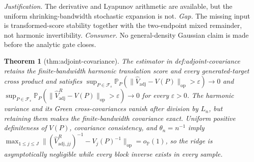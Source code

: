 \documentclass{article}
\newtheorem{theorem}{Theorem}
\begin{document}
\par\smallskip\noindent \textit{Justification.} The derivative and Lyapunov arithmetic are available, but the uniform shrinking-bandwidth stochastic expansion is not. \textit{Gap.} The missing input is transformed-score stability together with the two-endpoint mixed remainder, not harmonic invertibility. \textit{Consumer.} No general-density Gaussian claim is made before the analytic gate closes.

\begin{theorem}[thm:adjoint-covariance]\label{thm:adjoint-covariance}
The estimator in def:adjoint-covariance retains the finite-bandwidth harmonic translation score and every generated-target cross product and satisfies \(\sup_{P\in\mathcal F_s}\mathbb P_P(\lVert\widehat V_{\mathrm{adj}}-V(P)\rVert_{\mathrm{op}}>\varepsilon)\to0\) and \(\sup_{P\in\mathcal F_s}\mathbb P_P(\lVert\widehat V_{\mathrm{adj}}^{R}-V(P)\rVert_{\mathrm{op}}>\varepsilon)\to0\) for every \(\varepsilon>0\). The harmonic variance and its Green cross-covariances vanish after division by \(L_n\), but retaining them makes the finite-bandwidth covariance exact. Uniform positive definiteness of \(V(P)\), covariance consistency, and \(\theta_n=n^{-1}\) imply \(\max_{1\le j\le J}\lVert(\widehat V_{\mathrm{adj},jj}^{R})^{-1}-V_j(P)^{-1}\rVert_{\mathrm{op}}=o_{\mathbb P}(1)\), so the ridge is asymptotically negligible while every block inverse exists in every sample.
\end{theorem}
\end{document}
